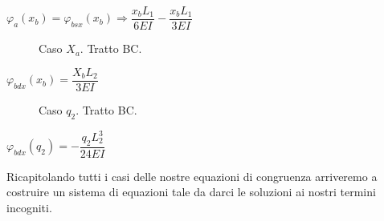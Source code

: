 \documentclass[a4paper,12pt, oneside]{book}
\begin{document}
	$ \varphi_a(x_b)=\varphi_{bsx}(x_b) \Rightarrow \dfrac{x_b L_1}{6EI}-\dfrac{x_b L_1}{3EI} $
	
	\begin{figure}[H]
		\centering
		\caption{Caso $X_a$. Tratto BC.}
		\label{fig:appappbnsdfsdf}
	\end{figure}
	
	$ \varphi_{bdx}(x_b)=\dfrac{X_b L_2}{3EI} $
	
	\begin{figure}[H]
		\centering
		\hspace*{1.2cm}
		\caption{Caso $q_2$. Tratto BC.}
		\label{fig:appappbnasdsdfsdfdj}
	\end{figure}
	
	$ \varphi_{bdx}(q_2)=-\dfrac{q_2 L_2^{3}}{24EI} $
	
	\phantom{.}
	
	Ricapitolando tutti i casi delle nostre equazioni di congruenza arriveremo a costruire un sistema di equazioni tale da darci le soluzioni ai nostri termini incogniti.
	
\end{document}
